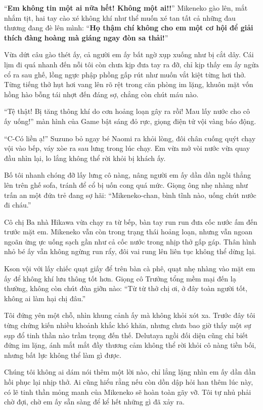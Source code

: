 ﻿\documentclass[../main.tex]{subfiles}
\begin{document}
``\textbf{Em không tin một ai nữa hết! Không một ai!!}'' Mikeneko gào lên, mắt nhắm tịt, hai tay cào xé không khí như thể muốn xé tan tất cả những đau thương đang đè lên mình: ``\textbf{Họ thậm chí không cho em một cơ hội để giải thích đàng hoàng mà giáng ngay đòn sa thải!}''

Vừa dứt câu gào thét ấy, cả người em ấy bất ngờ xụp xuống như bị cắt dây. Cái lịm đi quá nhanh đến nỗi tôi còn chưa kịp đưa tay ra đỡ, chỉ kịp thấy em ấy ngửa cổ ra sau ghế, lồng ngực phập phồng gấp rút như muốn vắt kiệt từng hơi thở. Từng tiếng thở hụt hơi vang lên rõ rệt trong căn phòng im lặng, khuôn mặt vốn hồng hào bỗng tái nhợt đến đáng sợ, chẳng còn chút máu nào.

``Tệ thật! Bị tăng thông khí do cơn hoảng loạn gây ra rồi! Mau lấy nước cho cô ấy uống!'' màn hình của Game bật sáng đỏ rực, giọng điện tử vội vàng báo động.

``C-Có liền ạ!'' Suzuno bỏ ngay bé Naomi ra khỏi lòng, đôi chân cuống quýt chạy vội vào bếp, váy xòe ra sau lưng trong lúc chạy. Em vừa mở vòi nước vừa quay đầu nhìn lại, lo lắng không thể rời khỏi bị khách ấy.

Bố tôi nhanh chóng đỡ lấy lưng cô nàng, nâng người em ấy dần dần ngồi thẳng lên trên ghế sofa, tránh để cổ bị uốn cong quá mức. Giọng ông nhẹ nhàng như trấn an một đứa trẻ đang sợ hãi: ``Mikeneko-chan, bình tĩnh nào, uống chút nước đi cháu.''

Cô chị Ba nhà Hikawa vừa chạy ra từ bếp, bàn tay run run đưa cốc nước ấm đến trước mặt em. Mikeneko vẫn còn trong trạng thái hoảng loạn, nhưng vẫn ngoan ngoãn ừng ực uống sạch gần như cả cốc nước trong nhịp thở gấp gáp. Thân hình nhỏ bé ấy vẫn không ngừng run rẩy, đôi vai rung lên liên tục không thể dừng lại.

Kson vội với lấy chiếc quạt giấy để trên bàn cà phê, quạt nhẹ nhàng vào mặt em ấy để không khí lưu thông tốt hơn. Giọng cô Trưởng tổng mềm mại đến lạ thường, không còn chút đùa giỡn nào: ``Từ từ thở chị ơi, ở đây toàn người tốt, không ai làm hại chị đâu.''

Tôi đứng yên một chỗ, nhìn khung cảnh ấy mà không khỏi xót xa. Trước đây tôi từng chứng kiến nhiều khoảnh khắc khó khăn, nhưng chưa bao giờ thấy một sự sụp đổ tinh thần nào trầm trọng đến thế. Delutaya ngồi đối diện cũng chỉ biết đứng im lặng, ánh mắt mắt đầy thương cảm không thể rời khỏi cô nàng tiền bối, nhưng bất lực không thể làm gì được.

Chúng tôi không ai dám nói thêm một lời nào, chỉ lẳng lặng nhìn em ấy dần dần hồi phục lại nhịp thở. Ai cũng hiểu rằng nếu còn dồn dập hỏi han thêm lúc này, có lẽ tinh thần mỏng manh của Mikeneko sẽ hoàn toàn gãy vỡ. Tôi tự nhủ phải chờ đợi, chờ em ấy sẵn sàng để kể hết những gì đã xảy ra.
\end{document}
